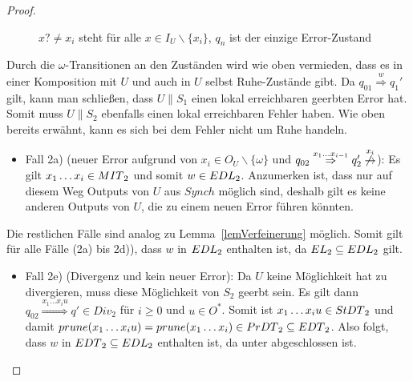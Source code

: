 \begin{proof}
\begin{itemize}
\begin{figure} [h!tbp]
\begin{center}
        \caption{$x?\neq x_i$ steht für alle $x\in I_U\backslash\{x_i\}$, $q_n$
          ist der einzige Error-Zustand}
\label{UmitEundO}
      \end{center}
      \end{figure}
      Durch die $\omega$-Transitionen an den Zuständen wird wie oben vermieden,
      dass es in einer Komposition mit $U$ und auch in $U$ selbst Ruhe-Zustände
      gibt. Da $q_{01} \overset{w}{\Rightarrow} q_1'$ gilt, kann man schließen,
      dass $U\|S_1$ einen lokal erreichbaren geerbten Error hat. Somit muss
      $U\|S_2$ ebenfalls einen lokal erreichbaren Fehler haben. Wie oben
      bereits erwähnt, kann es sich bei dem Fehler nicht um Ruhe handeln.
      \begin{itemize}
        \item Fall 2a) (neuer Error aufgrund von $x_i\in O_U\backslash
          \{\omega\}$ und $q_{02} \overset{x_1\dots x_{i-1}}{\Rightarrow} q_2'
          \overset{x_i}{\not{\hspace{-0.1cm}\rightarrow}}$): Es gilt $x_1\dots
          x_i\in MIT{}_2$ und somit $w\in EDL{}_2$. Anzumerken ist, dass nur
          auf diesem Weg Outputs von $U$ aus $Synch$ möglich sind, deshalb gilt
          es keine anderen Outputs von $U$, die zu einem neuen Error führen
          könnten.
      \end{itemize}
      Die restlichen Fälle sind analog zu Lemma~\ref{lemVerfeinerung} möglich.
      Somit gilt für alle Fälle (2a) bis 2d)), dass $w$ in $EDL{}_2$ enthalten
      ist, da $EL{}_2\subseteq EDL{}_2$ gilt.
      \begin{itemize}
        \item Fall 2e) (Divergenz und kein neuer Error): Da $U$ keine
          Möglichkeit hat zu divergieren, muss diese Möglichkeit von $S_2$
          geerbt sein. Es gilt dann $q_{02} \overset{x_1\dots
          x_iu}{\Rightarrow} q'\in Div_2$ für $i\geq 0$ und $u\in O^*$. Somit
          ist $x_1\dots x_iu\in StDT{}_2$ und damit $prune{}(x_1\dots x_iu)=
          prune{}(x_1\dots x_i)\in PrDT{}_2\subseteq EDT{}_2$. Also folgt,
          dass $w$ in $EDT{}_2 \subseteq EDL{}_2$ enthalten ist, da \DT{}
          unter \cont{} abgeschlossen ist.
      \end{itemize}
  \end{itemize}
\end{proof}


